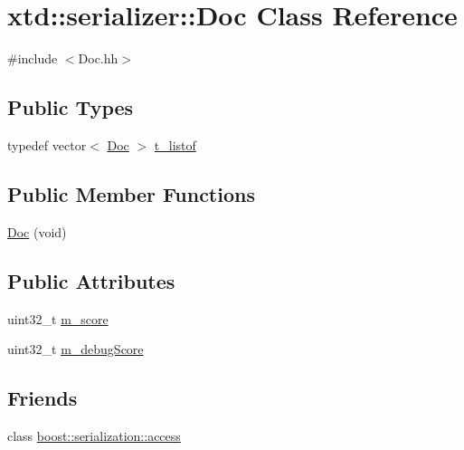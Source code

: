 \hypertarget{classxtd_1_1serializer_1_1Doc}{}\section{xtd\+:\+:serializer\+:\+:Doc Class Reference}
\label{classxtd_1_1serializer_1_1Doc}


{\ttfamily \#include $<$Doc.\+hh$>$}

\subsection*{Public Types}
\begin{DoxyCompactItemize}
\item 
typedef vector$<$ \hyperlink{classxtd_1_1serializer_1_1Doc}{Doc} $>$ \hyperlink{classxtd_1_1serializer_1_1Doc_a993fd17fc627ae6d1af0aad1a11e9975}{t\+\_\+listof}
\end{DoxyCompactItemize}
\subsection*{Public Member Functions}
\begin{DoxyCompactItemize}
\item 
\hyperlink{classxtd_1_1serializer_1_1Doc_ab1d69c51eaac6754260114a91186061f}{Doc} (void)
\end{DoxyCompactItemize}
\subsection*{Public Attributes}
\begin{DoxyCompactItemize}
\item 
uint32\+\_\+t \hyperlink{classxtd_1_1serializer_1_1Doc_ac6e0a47819dac6373483fb0dd5ad91d0}{m\+\_\+score}
\item 
uint32\+\_\+t \hyperlink{classxtd_1_1serializer_1_1Doc_ae35b707444a257c668b6cc8dfb2d63e4}{m\+\_\+debug\+Score}
\end{DoxyCompactItemize}
\subsection*{Friends}
\begin{DoxyCompactItemize}
\item 
class \hyperlink{classxtd_1_1serializer_1_1Doc_ac98d07dd8f7b70e16ccb9a01abf56b9c}{boost\+::serialization\+::access}
\end{DoxyCompactItemize}


